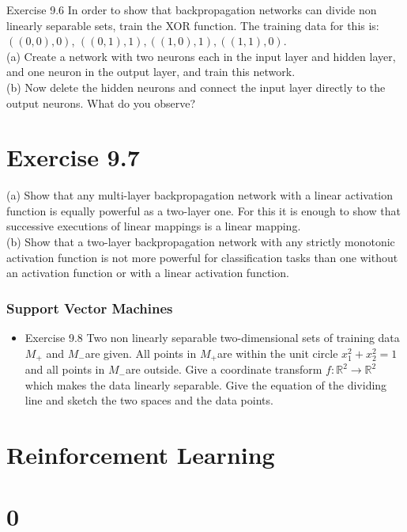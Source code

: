 \documentclass[10pt]{book}
\begin{document}
Exercise 9.6 In order to show that backpropagation networks can divide non linearly separable sets, train the XOR function. The training data for this is: $((0,0), 0)$, $((0,1), 1),((1,0), 1),((1,1), 0)$.\\
(a) Create a network with two neurons each in the input layer and hidden layer, and one neuron in the output layer, and train this network.\\
(b) Now delete the hidden neurons and connect the input layer directly to the output neurons. What do you observe?

\section*{Exercise 9.7}
(a) Show that any multi-layer backpropagation network with a linear activation function is equally powerful as a two-layer one. For this it is enough to show that successive executions of linear mappings is a linear mapping.\\
(b) Show that a two-layer backpropagation network with any strictly monotonic activation function is not more powerful for classification tasks than one without an activation function or with a linear activation function.

\subsubsection*{Support Vector Machines}
\begin{itemize}
  \item Exercise 9.8 Two non linearly separable two-dimensional sets of training data $M_{+}$ and $M_{-}$are given. All points in $M_{+}$are within the unit circle $x_{1}^{2}+x_{2}^{2}=1$ and all points in $M_{-}$are outside. Give a coordinate transform $f: \mathbb{R}^{2} \rightarrow \mathbb{R}^{2}$ which makes the data linearly separable. Give the equation of the dividing line and sketch the two spaces and the data points.
\end{itemize}

\section*{Reinforcement Learning}
\section*{0}
\end{document}
